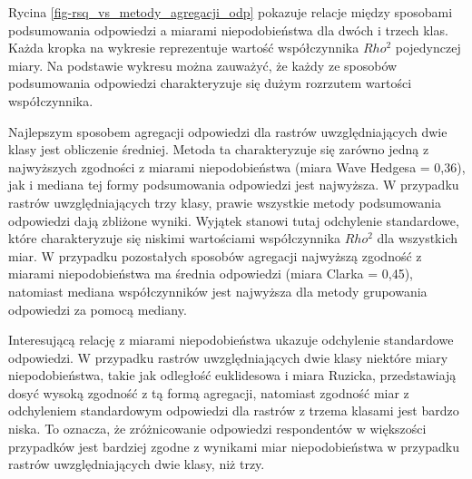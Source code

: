 \documentclass{amuthesis}
\begin{document}
Rycina \ref{fig-rsq_vs_metody_agregacji_odp} pokazuje relacje między
sposobami podsumowania odpowiedzi a miarami niepodobieństwa dla dwóch i
trzech klas. Każda kropka na wykresie reprezentuje wartość współczynnika
\(Rho^2\) pojedynczej miary. Na podstawie wykresu można zauważyć, że
każdy ze sposobów podsumowania odpowiedzi charakteryzuje się dużym
rozrzutem wartości współczynnika.

Najlepszym sposobem agregacji odpowiedzi dla rastrów uwzględniających
dwie klasy jest obliczenie średniej. Metoda ta charakteryzuje się
zarówno jedną z najwyższych zgodności z miarami niepodobieństwa (miara
Wave Hedgesa = 0,36), jak i mediana tej formy podsumowania odpowiedzi
jest najwyższa. W przypadku rastrów uwzględniających trzy klasy, prawie
wszystkie metody podsumowania odpowiedzi dają zbliżone wyniki. Wyjątek
stanowi tutaj odchylenie standardowe, które charakteryzuje się niskimi
wartościami współczynnika \(Rho^2\) dla wszystkich miar. W przypadku
pozostałych sposobów agregacji najwyższą zgodność z miarami
niepodobieństwa ma średnia odpowiedzi (miara Clarka = 0,45), natomiast
mediana współczynników jest najwyższa dla metody grupowania odpowiedzi
za pomocą mediany.

Interesującą relację z miarami niepodobieństwa ukazuje odchylenie
standardowe odpowiedzi. W przypadku rastrów uwzględniających dwie klasy
niektóre miary niepodobieństwa, takie jak odległość euklidesowa i miara
Ruzicka, przedstawiają dosyć wysoką zgodność z tą formą agregacji,
natomiast zgodność miar z odchyleniem standardowym odpowiedzi dla
rastrów z trzema klasami jest bardzo niska. To oznacza, że zróżnicowanie
odpowiedzi respondentów w większości przypadków jest bardziej zgodne z
wynikami miar niepodobieństwa w przypadku rastrów uwzględniających dwie
klasy, niż trzy.
\end{document}
